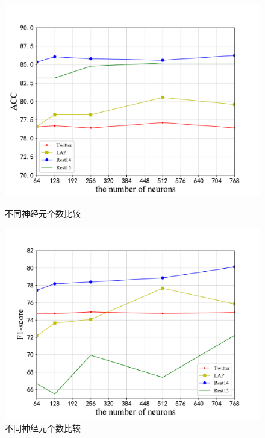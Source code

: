 \begin{figure}[htb]
    \begin{minipage}[t]{0.5\linewidth}
    \centering
    \includegraphics[width=1\textwidth]{pic/unitACC.pdf}
    \caption{不同神经元个数比较}
    \label{paraunitacc}
    \end{minipage}
    \quad
    \begin{minipage}[t]{0.5\linewidth}
    \centering
    \includegraphics[width=1\textwidth]{pic/unitF1.pdf}
    \caption{不同神经元个数比较}
    \label{paraunitf1}
    \end{minipage}
\end{figure}



